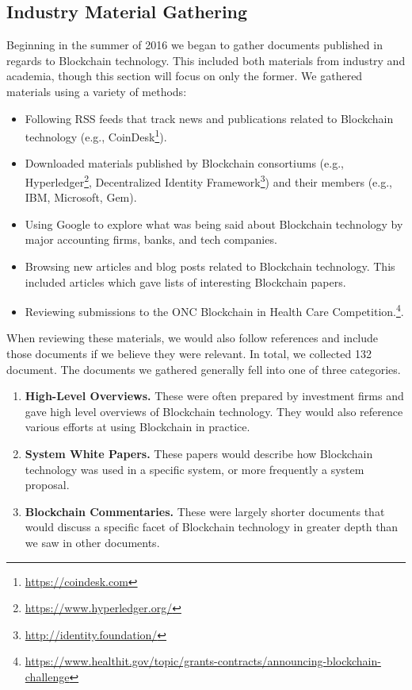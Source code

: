 \subsection{Industry Material Gathering}
Beginning in the summer of 2016 we began to gather documents published in regards to Blockchain technology.
This included both materials from industry and academia, though this section will focus on only the former.
We gathered materials using a variety of methods:

\begin{itemize}
	\item Following RSS feeds that track news and publications related to Blockchain technology (e.g., CoinDesk\footnote{\url{https://coindesk.com}}).
	\item Downloaded materials published by Blockchain consortiums (e.g., Hyperledger\footnote{\url{https://www.hyperledger.org/}}, Decentralized Identity Framework\footnote{\url{http://identity.foundation/}}) and their members (e.g., IBM, Microsoft, Gem).
	\item Using Google to explore what was being said about Blockchain technology by major accounting firms, banks, and tech companies.
	\item Browsing new articles and blog posts related to Blockchain technology. This included articles which gave lists of interesting Blockchain papers.
	\item Reviewing submissions to the ONC Blockchain in Health Care Competition.\footnote{\url{https://www.healthit.gov/topic/grants-contracts/announcing-blockchain-challenge}}.
\end{itemize}

When reviewing these materials, we would also follow references and include those documents if we believe they were relevant.
In total, we collected 132 document.
The documents we gathered generally fell into one of three categories.

\begin{enumerate}
	\item \textbf{High-Level Overviews.} These were often prepared by investment firms and gave high level overviews of Blockchain technology. They would also reference various efforts at using Blockchain in practice.
	\item \textbf{System White Papers.} These papers would describe how Blockchain technology was used in a specific system, or more frequently a system proposal.
	\item \textbf{Blockchain Commentaries.} These were largely shorter documents that would discuss a specific facet of Blockchain technology in greater depth than we saw in other documents.
\end{enumerate}

